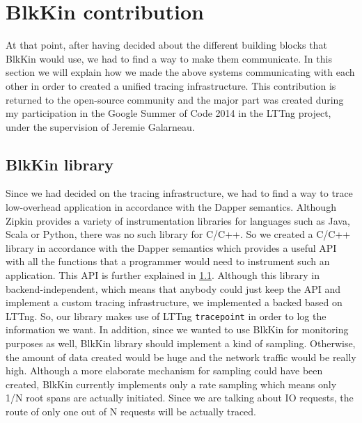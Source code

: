 \section{BlkKin contribution}

At that point, after having decided about the different building blocks that
BlkKin would use, we had to find a way to make them communicate. In this section
we will explain how we made the above systems communicating with each other in
order to created a unified tracing infrastructure. This contribution is returned
to the open-source community and the major part was created during my
participation in the Google Summer of Code 2014 in the LTTng project, under the
supervision of Jeremie Galarneau.

\subsection{BlkKin library}
Since we had decided on the tracing infrastructure, we had to find a way to
trace low-overhead application in accordance with the Dapper semantics. Although
Zipkin provides a variety of instrumentation libraries for languages such as
Java, Scala or Python, there was no such library for C/C++. So we created a
C/C++ library in accordance with the Dapper semantics which provides a useful
API with all the functions that a programmer would need to instrument such an
application. This API is further explained in \ref{}. Although this library in
backend-independent, which means that anybody could just keep the API and
implement a custom tracing infrastructure, we implemented a backed based on
LTTng. So, our library makes use of LTTng \texttt{tracepoint} in order to log
the information we want. In addition, since we wanted to use BlkKin for
monitoring purposes as well, BlkKin library should implement a kind of sampling.
Otherwise, the amount of data created would be huge and the network traffic
would be really high. Although a more elaborate mechanism for sampling could
have been created, BlkKin currently implements only a rate sampling which means
only 1/N root spans are actually initiated. Since we are talking about IO
requests, the route of only one out of N requests will be actually traced.

